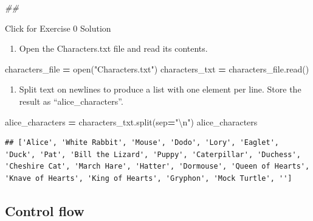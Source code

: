 \documentclass[
]{book}
\newenvironment{Shaded}{\begin{snugshade}}{\end{snugshade}}
\newcommand{\BuiltInTok}[1]{#1}
\newcommand{\CharTok}[1]{\textcolor[rgb]{0.31,0.60,0.02}{#1}}
\newcommand{\CommentTok}[1]{\textcolor[rgb]{0.56,0.35,0.01}{\textit{#1}}}
\newcommand{\NormalTok}[1]{#1}
\newcommand{\OperatorTok}[1]{\textcolor[rgb]{0.81,0.36,0.00}{\textbf{#1}}}
\newcommand{\StringTok}[1]{\textcolor[rgb]{0.31,0.60,0.02}{#1}}
\providecommand{\tightlist}{%
  \setlength{\itemsep}{0pt}\setlength{\parskip}{0pt}}
\begin{document}
\begin{Shaded}
\begin{Highlighting}[]
\CommentTok{\#\#}
\end{Highlighting}
\end{Shaded}

{Click for Exercise 0 Solution}

\begin{enumerate}
\def\labelenumi{\arabic{enumi}.}
\tightlist
\item
  Open the Characters.txt file and read its contents.
\end{enumerate}

\begin{Shaded}
\begin{Highlighting}[]
\NormalTok{characters\_file }\OperatorTok{=} \BuiltInTok{open}\NormalTok{(}\StringTok{"Characters.txt"}\NormalTok{)}
\NormalTok{characters\_txt }\OperatorTok{=}\NormalTok{ characters\_file.read()}
\end{Highlighting}
\end{Shaded}

\begin{enumerate}
\def\labelenumi{\arabic{enumi}.}
\setcounter{enumi}{1}
\tightlist
\item
  Split text on newlines to produce a list with one element per line.
  Store the result as ``alice\_characters''.
\end{enumerate}

\begin{Shaded}
\begin{Highlighting}[]
\NormalTok{alice\_characters }\OperatorTok{=}\NormalTok{ characters\_txt.split(sep}\OperatorTok{=}\StringTok{"}\CharTok{\textbackslash{}n}\StringTok{"}\NormalTok{)}
\NormalTok{alice\_characters}
\end{Highlighting}
\end{Shaded}

\begin{verbatim}
## ['Alice', 'White Rabbit', 'Mouse', 'Dodo', 'Lory', 'Eaglet', 'Duck', 'Pat', 'Bill the Lizard', 'Puppy', 'Caterpillar', 'Duchess', 'Cheshire Cat', 'March Hare', 'Hatter', 'Dormouse', 'Queen of Hearts', 'Knave of Hearts', 'King of Hearts', 'Gryphon', 'Mock Turtle', '']
\end{verbatim}

\hypertarget{control-flow}{%
\subsection{Control flow}\label{control-flow}}
\end{document}
